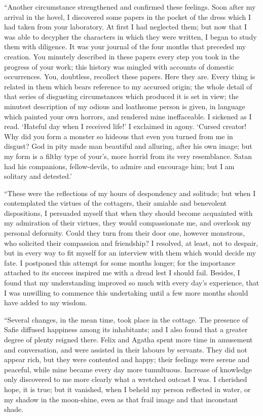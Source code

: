 ``Another circumstance strengthened
and confirmed these feelings. Soon
after my arrival in the hovel, I discovered
some papers in the pocket of
the dress which I had taken from your
laboratory. At first I had neglected
them; but now that I was able to decypher
the characters in which they
were written, I began to study them
with diligence. It was your journal of
the four months that preceded my creation.
You minutely described in these
papers every step you took in the progress
of your work; this history was
mingled with accounts of domestic occurrences.
You, doubtless, recollect
these papers. Here they are. Every
thing is related in them which bears
reference to my accursed origin; the
whole detail of that series of disgusting
circumstances which produced it is set
in view; the minutest description of
my odious and loathsome person is
given, in language which painted your
own horrors, and rendered mine ineffaceable.
I sickened as I read. `Hateful
day when I received life!' I exclaimed
in agony. `Cursed creator!
Why did you form a monster so hideous
that even you turned from me in disgust?
God in pity made man beautiful
and alluring, after his own image;
but my form is a filthy type of your's,
more horrid from its very resemblance.
Satan had his companions, fellow-devils,
to admire and encourage him;
but I am solitary and detested.'

``These were the reflections of my
hours of despondency and solitude;
but when I contemplated the virtues of
the cottagers, their amiable and benevolent
dispositions, I persuaded myself
that when they should become acquainted
with my admiration of their virtues,
they would compassionate me, and
overlook my personal deformity. Could
they turn from their door one, however
monstrous, who solicited their compassion
and friendship? I resolved, at
least, not to despair, but in every way
to fit myself for an interview with them
which would decide my fate. I postponed
this attempt for some months
longer; for the importance attached to
its success inspired me with a dread
lest I should fail. Besides, I found
that my understanding improved so
much with every day's experience, that
I was unwilling to commence this undertaking
until a few more months
should have added to my wisdom.

``Several changes, in the mean time,
took place in the cottage. The presence
of Safie diffused happiness among
its inhabitants; and I also found that a
greater degree of plenty reigned there.
Felix and Agatha spent more time in
amusement and conversation, and were
assisted in their labours by servants.
They did not appear rich, but they
were contented and happy; their feelings
were serene and peaceful, while
mine became every day more tumultuous.
Increase of knowledge only
discovered to me more clearly what a
wretched outcast I was. I cherished
hope, it is true; but it vanished, when I
beheld my person reflected in water, or
my shadow in the moon-shine, even
as that frail image and that inconstant
shade.


